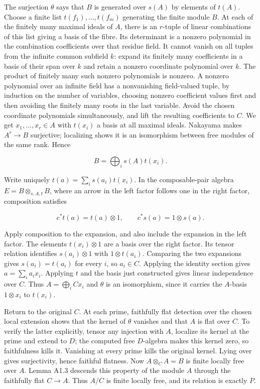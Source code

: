 \documentclass[11pt,a4paper,openany]{report}
\begin{document}
The surjection \(\theta\) says that \(B\) is generated over \(s(A)\) by elements of \(t(A)\). Choose a finite list \(t(f_1),\ldots,t(f_m)\) generating the finite module \(B\). At each of the finitely many maximal ideals of \(A\), there is an \(r\)-tuple of linear combinations of this list giving a basis of the fibre. Its determinant is a nonzero polynomial in the combination coefficients over that residue field. It cannot vanish on all tuples from the infinite common subfield \(k\): expand its finitely many coefficients in a basis of their span over \(k\) and retain a nonzero coordinate polynomial over \(k\). The product of finitely many such nonzero polynomials is nonzero. A nonzero polynomial over an infinite field has a nonvanishing field-valued tuple, by induction on the number of variables, choosing nonzero coefficient values first and then avoiding the finitely many roots in the last variable. Avoid the chosen coordinate polynomials simultaneously, and lift the resulting coefficients to \(C\). We get \(x_1,\ldots,x_r\in A\) with \(t(x_i)\) a basis at all maximal ideals. Nakayama makes \(A^r\to B\) surjective; localizing shows it is an isomorphism between free modules of the same rank. Hence

\[
B=\bigoplus_i s(A)t(x_i).
\]

Write uniquely \(t(a)=\sum_i s(a_i)t(x_i)\). In the composable-pair algebra \(E=B\otimes_{s,A,t}B\), where an arrow in the left factor follows one in the right factor, composition satisfies

\[
c^*t(a)=t(a)\otimes1,\qquad c^*s(a)=1\otimes s(a).
\]

Apply composition to the expansion, and also include the expansion in the left factor. The elements \(t(x_i)\otimes1\) are a basis over the right factor. Its tensor relation identifies \(s(a_i)\otimes1\) with \(1\otimes t(a_i)\). Comparing the two expansions gives \(s(a_i)=t(a_i)\) for every \(i\), so \(a_i\in C\). Applying the identity section gives \(a=\sum_i a_i x_i\). Applying \(t\) and the basis just constructed gives linear independence over \(C\). Thus \(A=\bigoplus_i Cx_i\) and \(\theta\) is an isomorphism, since it carries the \(A\)-basis \(1\otimes x_i\) to \(t(x_i)\).

Return to the original \(C\). At each prime, faithfully flat detection over the chosen local extension shows that the kernel of \(\theta\) vanishes and that \(A\) is flat over \(C\). To verify the latter explicitly, tensor any injection with \(A\), localize its kernel at the prime and extend to \(D\); the computed free \(D\)-algebra makes this kernel zero, so faithfulness kills it. Vanishing at every prime kills the original kernel. Lying over gives surjectivity, hence faithful flatness. Now \(A\otimes_C A=B\) is finite locally free over \(A\). Lemma A1.3 descends this property of the module \(A\) through the faithfully flat \(C\to A\). Thus \(A/C\) is finite locally free, and its relation is exactly \(P\).
\end{document}
